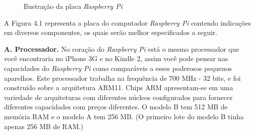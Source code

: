 \begin{figure}[ht]
    \centering
    \caption{Ilustração da placa \textit{Raspberry Pi}}
\end{figure}

A Figura 4.1 representa a placa do computador \textit{Raspberry Pi} contendo indicações em diversos componentes, os quais serão melhor especificados a seguir.

\textbf{A. Processador.} No coração do \textit{Raspberry Pi} está o mesmo processador que você encontraria no iPhone 3G e no Kindle 2, assim você pode pensar nas capacidades do \textit{Raspberry Pi} como comparáveis a esses poderosos pequenos aparelhos. Este processador trabalha na frequência de 700 MHz - 32 bits, e foi construído sobre a arquitetura ARM11. Chips ARM apresentam-se em uma variedade de arquiteturas com diferentes núcleos configurados para fornecer diferentes capacidades com preços diferentes. O modelo B tem 512 MB de memória RAM e o modelo A tem 256 MB. (O primeiro lote do modelo B tinha apenas 256 MB de RAM.)
    

